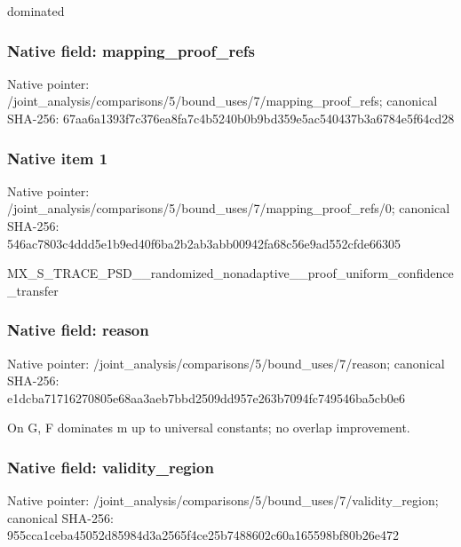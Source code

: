 \documentclass[10pt,a4paper]{article}
\begin{document}
\begingroup\raggedright\sloppy dominated\par\endgroup

\subsubsection{Native field: mapping\_\allowbreak{}proof\_\allowbreak{}refs}
Native pointer: /joint\_\allowbreak{}analysis/comparisons/5/bound\_\allowbreak{}uses/7/mapping\_\allowbreak{}proof\_\allowbreak{}refs; canonical SHA-256: 67aa6a1393f7c376ea8fa7c4b5240b0b9bd359e5ac540437b3a6784e5f64cd28

\subsubsection{Native item 1}
Native pointer: /joint\_\allowbreak{}analysis/comparisons/5/bound\_\allowbreak{}uses/7/mapping\_\allowbreak{}proof\_\allowbreak{}refs/0; canonical SHA-256: 546ac7803c4ddd5e1b9ed40f6ba2b2ab3abb00942fa68c56e9ad552cfde66305

\begingroup\raggedright\sloppy MX\_\allowbreak{}S\_\allowbreak{}TRACE\_\allowbreak{}PSD\_\allowbreak{}\_\allowbreak{}randomized\_\allowbreak{}nonadaptive\_\allowbreak{}\_\allowbreak{}proof\_\allowbreak{}uniform\_\allowbreak{}confidence\_\allowbreak{}transfer\par\endgroup

\subsubsection{Native field: reason}
Native pointer: /joint\_\allowbreak{}analysis/comparisons/5/bound\_\allowbreak{}uses/7/reason; canonical SHA-256: e1dcba71716270805e68aa3aeb7bbd2509dd957e263b7094fc749546ba5cb0e6

\begingroup\raggedright\sloppy On G,\allowbreak{} F dominates m up to universal constants;\allowbreak{} no overlap improvement.\par\endgroup

\subsubsection{Native field: validity\_\allowbreak{}region}
Native pointer: /joint\_\allowbreak{}analysis/comparisons/5/bound\_\allowbreak{}uses/7/validity\_\allowbreak{}region; canonical SHA-256: 955cca1ceba45052d85984d3a2565f4ce25b7488602c60a165598bf80b26e472
\end{document}
